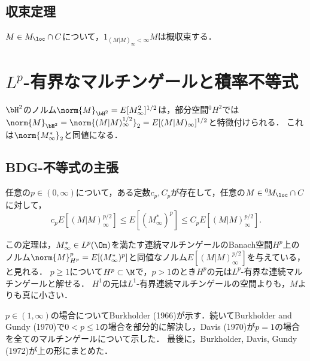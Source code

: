 \documentclass[uplatex,dvipdfmx]{jsreport}
\begin{document}
\subsection{収束定理}

\begin{proposition}
    $M\in M_\loc\cap C$について，$1_{(M|M)_\infty<\infty}M$は概収束する．
\end{proposition}

\section{$L^p$-有界なマルチンゲールと積率不等式}

\begin{tcolorbox}[colframe=ForestGreen, colback=ForestGreen!10!white,breakable,colbacktitle=ForestGreen!40!white,coltitle=black,fonttitle=\bfseries\sffamily,
title=]
    $\bH^2$のノルム$\norm{M}_{\bH^2}=E[M^2_\infty]^{1/2}$は，部分空間${}^0\!H^2$では$\norm{M}_{\bH^2}=\norm{(M|M)_\infty^{1/2}}_2=E[(M|M)_\infty]^{1/2}$と特徴付けられる．
    これは$\norm{M^*_\infty}_2$と同値になる．
\end{tcolorbox}

\subsection{BDG-不等式の主張}

\begin{theorem}
    任意の$p\in(0,\infty)$について，ある定数$c_p,C_p$が存在して，任意の$M\in {}^0\!M_\loc\cap C$に対して，
    \[c_pE[(M|M)_\infty^{p/2}]\le E[(M^*_\infty)^p]\le C_pE[(M|M)^{p/2}_\infty].\]
\end{theorem}
\begin{remarks}
    この定理は，$M^*_\infty\in L^p(\Om)$を満たす連続マルチンゲールのBanach空間$H^p$上のノルム$\norm{M}_{H^p}^p=E[(M^*_\infty)^p]$と同値なノルム$E[(M|M)^{p/2}_\infty]$を与えている，と見れる．
    $p\ge1$について$H^p\subset\M$で，$p>1$のとき$H^p$の元は$L^p$-有界な連続マルチンゲールと解せる．
    $H^1$の元は$L^1$-有界連続マルチンゲールの空間よりも，$M$よりも真に小さい．
\end{remarks}
\begin{history}
    $p\in(1,\infty)$の場合についてBurkholder (1966)が示す．続いてBurkholder and Gundy (1970)で$0<p\le 1$の場合を部分的に解決し，Davis (1970)が$p=1$の場合を全てのマルチンゲールについて示した．
    最後に，Burkholder, Davis, Gundy (1972)が上の形にまとめた．
\end{history}
\end{document}
